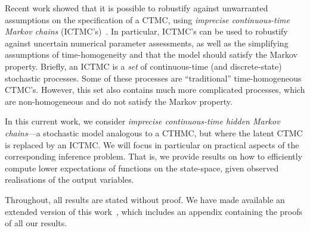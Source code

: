 \documentclass[twoside,11pt]{article}
\begin{document}
Recent work showed that it is possible to robustify against unwarranted assumptions on the specification of a CTMC, using \emph{imprecise continuous-time Markov chains} (ICTMC's)~\citep{Skulj:2015cq, krak2016ictmc}. In particular, ICTMC's can be used to robustify against uncertain numerical parameter assessments, as well as the simplifying assumptions of time-homogeneity and that the model should satisfy the Markov property. Briefly, an ICTMC is a \emph{set} of continuous-time (and discrete-state) stochastic processes. Some of these processes are ``traditional'' time-homogeneous CTMC's. However, this set also contains much more complicated processes, which are non-homogeneous and do not satisfy the Markov property.



In this current work, we consider \emph{imprecise continuous-time hidden Markov chains}---a stochastic model analogous to a CTHMC, but where the latent CTMC is replaced by an ICTMC. We will focus in particular on practical aspects of the corresponding inference problem. That is, we provide results on how to efficiently compute lower expectations of functions on the state-space, given observed realisations of the output variables.

Throughout, all results are stated without proof. We have made available an extended version of this work~\citep{krak2017icthmc}, which includes an appendix containing the proofs of all our results.

\end{document}
